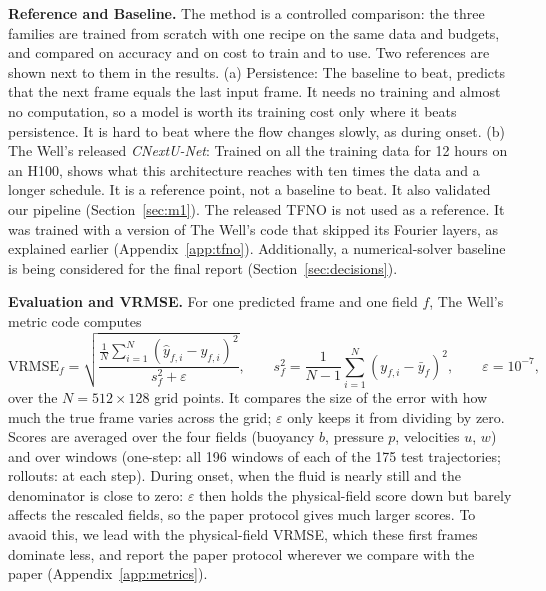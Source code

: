 \documentclass[11pt]{article}
\begin{document}
\textbf{Reference and Baseline.} The method is a controlled comparison: the three families are trained from scratch
with one recipe on the same data and budgets, and compared on accuracy and on cost to train and to use. Two
references are shown next to them in the results. (a) Persistence: The baseline to beat, predicts that the next frame equals the last input frame. It needs no training and almost no computation, so a model is worth its training cost only where it beats persistence. It is hard to beat where the flow changes slowly, as during onset. (b) The Well's released \emph{CNextU-Net}: Trained on all the training data for 12 hours on an H100, shows what this architecture reaches with ten times the data and a longer schedule. It is a reference point, not a baseline to beat. It also validated our pipeline (Section~\ref{sec:m1}).
The released TFNO is not used as a reference. It was trained with a version of The Well's code that skipped its
Fourier layers, as explained earlier
(Appendix~\ref{app:tfno}). 
Additionally, a numerical-solver baseline is being considered for the final report (Section~\ref{sec:decisions}).

\textbf{Evaluation and VRMSE.} For one predicted frame and one field $f$, The Well's metric code computes
\[
\mathrm{VRMSE}_f=\sqrt{\frac{\frac{1}{N}\sum_{i=1}^{N}(\hat y_{f,i}-y_{f,i})^2}{s_f^2+\varepsilon}},
\qquad s_f^2=\frac{1}{N-1}\sum_{i=1}^{N}(y_{f,i}-\bar y_f)^2,\qquad \varepsilon=10^{-7},
\]
over the $N=512\times128$ grid points. It compares the size of the error with how much the true frame varies across
the grid; $\varepsilon$ only keeps it from dividing by zero. Scores are averaged over the four fields (buoyancy $b$,
pressure $p$, velocities $u$, $w$) and over windows (one-step: all 196 windows of each of the 175 test trajectories;
rollouts: at each step). 
During  onset, when the fluid is nearly still and the denominator is close to zero: $\varepsilon$ then holds the
physical-field score down but barely affects the rescaled fields, so the paper protocol gives much larger scores. To avaoid this, we
lead with the physical-field VRMSE, which these first frames dominate less, and report the paper protocol wherever we
compare with the paper (Appendix~\ref{app:metrics}).
\end{document}
